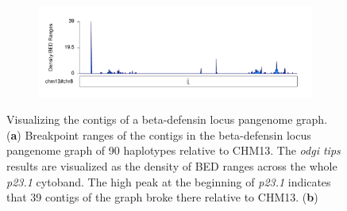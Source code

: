 \begin{figure}[ht!]
	\begin{subfigure}{\linewidth}
		\caption{}
		\centering
		\includegraphics[width=1.0\linewidth, trim=0cm 2.75cm 0cm 0cm]{fig/tips/chr8_chm13_beta_defensin_locus_odgi_tips_w50000_karyoploteR}
		\label{fig:tips-karyo}
	\end{subfigure}
	\caption{Visualizing the contigs of a beta-defensin locus pangenome graph. (\textbf{a}) Breakpoint ranges of the contigs in the beta-defensin locus pangenome graph of 90 haplotypes relative to CHM13. The \textit{odgi tips} results are visualized as the density of BED ranges across the whole \textit{p23.1} cytoband. The high peak at the beginning of \textit{p23.1} indicates that 39 contigs of the graph broke there relative to CHM13. (\textbf{b}) }
	\label{fig:tips}
\end{figure}
